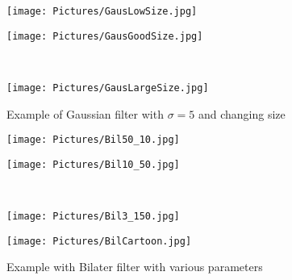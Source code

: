 \documentclass[11pt,a4paper]{article}
\begin{document}
\begin{figure}[htbp]
  \centering
  \begin{minipage}{0.5\textwidth}
    \centering
  \texttt{[image: Pictures/GausLowSize.jpg]}
  \end{minipage}%
  \begin{minipage}{0.5\textwidth}
    \centering
  \texttt{[image: Pictures/GausGoodSize.jpg]}
  \end{minipage}\\
  \begin{center}
  \begin{minipage}{0.5\textwidth}
    \centering
  \texttt{[image: Pictures/GausLargeSize.jpg]}
    \end{minipage}
  \end{center}
  \caption{Example of Gaussian filter with $\sigma=5$ and changing size}
  \end{figure}

  \begin{figure}[htbp]
    \centering
    \begin{minipage}{0.5\textwidth}
      \centering
    \texttt{[image: Pictures/Bil50\_10.jpg]}
    \end{minipage}%
    \begin{minipage}{0.5\textwidth}
      \centering
    \texttt{[image: Pictures/Bil10\_50.jpg]}
    \end{minipage}\\

\begin{minipage}{0.5\textwidth}
  \centering
\texttt{[image: Pictures/Bil3\_150.jpg]}
\end{minipage}%
    \begin{minipage}{0.5\textwidth}
      \centering
    \texttt{[image: Pictures/BilCartoon.jpg]}
    \label{fig:cartoon}
      \end{minipage}
    \caption{Example with Bilater filter with various parameters}
    \end{figure} 
\end{document}
